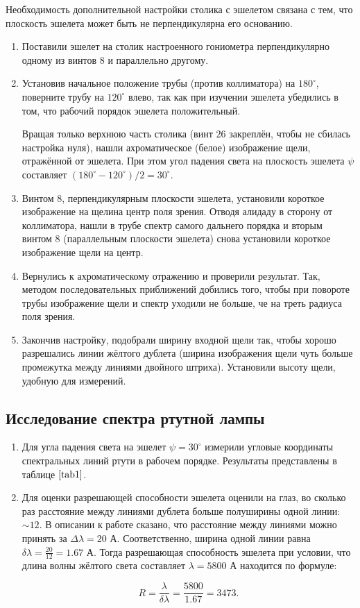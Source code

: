 \documentclass[a4paper,12pt]{article} %
\begin{document}
Необходимость дополнительной настройки столика с эшелетом связана с тем, что плоскость эшелета может быть не перпендикулярна его основанию. 

\begin{enumerate}
    \item Поставили эшелет на столик настроенного гониометра перпендикулярно одному из винтов $8$ и параллельно другому.
    \item Установив начальное положение трубы (против коллиматора) на $180^{\circ}$, поверните трубу на $120^{\circ}$ влево, так как при изучении эшелета убедились в том, что рабочий порядок эшелета положительный.

    Вращая только верхнюю часть столика (винт $26$ закреплён, чтобы не сбилась настройка нуля), нашли ахроматическое (белое) изображение щели, отражённой от эшелета. При этом угол падения света на плоскость эшелета $\psi$ составляет $(180^{\circ}-120^{\circ})/2=30^{\circ}$.
    \item Винтом $8$, перпендикулярным плоскости эшелета, установили короткое изображение на щелина центр поля зрения. Отводя алидаду в сторону от коллиматора, нашли в трубе спектр самого дальнего порядка и вторым винтом $8$ (параллельным плоскости эшелета) снова установили короткое изображение щели на центр.
    \item Вернулись к ахроматическому отражению и проверили результат. Так, методом последовательных приближений добились того, чтобы при повороте трубы изображение щели и спектр уходили не больше, че на треть радиуса поля зрения.
    \item Закончив настройку, подобрали ширину входной щели так, чтобы хорошо разрешались линии жёлтого дублета (ширина изображения щели чуть больше промежутка между линиями двойного штриха).
    Установили высоту щели, удобную для измерений.
\end{enumerate}

\subsection{Исследование спектра ртутной лампы}

\begin{enumerate}
    \item Для угла падения света на эшелет $\psi=30^{\circ}$ измерили угловые координаты спектральных линий ртути в рабочем порядке. Результаты представлены в таблице $\ref{tab1}$.

    \item Для оценки разрешающей способности эшелета оценили на глаз, во сколько раз расстояние между линиями дублета больше полуширины одной линии: $\sim12$. В описании к работе сказано, что расстояние между линиями можно принять за $\Delta\lambda=20\text{ А}$. Соответственно, ширина одной линии равна $\delta\lambda=\frac{20}{12}=1.67\text{ А}$. Тогда разрешающая способность эшелета при условии, что длина волны жёлтого света составляет $\lambda=5800\text{ А}$ находится по формуле:
    
    \[ R = \frac{\lambda}{\delta\lambda} = \frac{5800}{1.67} = 3473. \]
    
\end{enumerate}
\end{document}
